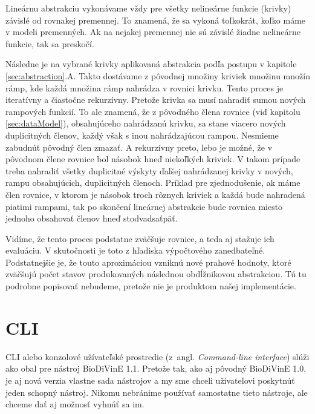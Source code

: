 \documentclass[11pt,final,oneside]{fithesis}
\begin{document}
Line\'arnu abstrakciu vykon\'avame v\v zdy pre v\v setky neline\'arne funkcie (krivky) z\'avisl\'e od rovnakej premennej. To znamen\'a, \v ze sa 
vykon\'a to\v lko\-kr\'at, ko\v lko m\'ame v modeli premenn\'ych. Ak na nejakej premennej nie s\'u z\'avisl\'e \v ziadne neline\'arne funkcie, tak sa 
presko\v c\'i.

N\'asledne je na vybran\'e krivky aplikovan\'a abstrakcia pod\v la postupu v kapitole \ref{sec:abstraction}.A. Takto dost\'avame z p\^ ovodnej mno\v ziny
kriviek mno\v zinu mno\v z\'in r\'amp, kde ka\v zd\'a mno\v zina r\'amp nahr\'adza v rovnici krivku. Tento proces je iterat\'ivny a \v ciasto\v cne 
rekurz\'ivny. Preto\v ze krivka sa mus\'i nahradi\v t sumou nov\'ych rampov\'ych funkci\'i. To ale znamen\'a, \v ze z p\^ ovodn\'eho \v clena rovnice 
(vi\v d kapitolu \ref{sec:dataModel}), obsahuj\'uceho nahr\'adzan\'u krivku, sa stane viacero nov\'ych duplicitn\'ych \v clenov, ka\v zd\'y v\v sak s inou 
nahr\'adzaj\'ucou rampou. Nesmieme zabudn\'u\v t p\^ ovodn\'y \v clen zmaza\v t. A rekurz\'ivny preto, lebo je mo\v zn\'e, \v ze v p\^ ovodnom \v clene rovnice
bol n\'asobok hne\v d nieko\v lk\'ych kriviek. V takom pr\'ipade treba nahradi\v t v\v setky duplicitn\'e v\'yskyty \v dal\v sej nahr\'adzanej krivky 
v nov\'ych, rampu obsahuj\'ucich, duplicitn\'ych \v clenoch. Pr\'iklad pre zjednodu\v senie, ak m\'ame \v clen rovnice, v ktorom je n\'asobok troch 
r\^ oznych kriviek a ka\v zd\'a bude nahraden\'a piatimi rampami, tak po skon\v cen\'i line\'arnej abstrakcie bude rovnica miesto jednoho obsahova\v t 
\v clenov hne\v d stodvadsa\v tp\" a\v t.

Vid\'ime, \v ze tento proces podstatne zv\" a\v c\v suje rovnice, a teda aj sta\v zuje ich evalu\'aciu. V skuto\v cnosti je toto z h\v ladiska 
v\'ypo\v ctov\'eho zanedbate\v ln\'e. Podstatnej\v sie je, \v ze touto aproxim\'aciou vznikn\'u nov\'e prahov\'e hodnoty, ktor\'e zv\" a\v c\v suj\'u 
po\v cet stavov produkovan\'ych n\'aslednou obd\'l\v znikovou abstrakciou. T\'u tu podrobne popisova\v t nebudeme, preto\v ze nie je produktom na\v sej 
implement\'acie.

\section{CLI}
\label{sec:implCLI}
CLI alebo konzolov\'e u\v z\'ivate\v lsk\'e prostredie (z~angl. {\it Command-line interface}) sl\'u\v zi ako obal pre n\'astroj BioDiVinE 1.1. Preto\v ze
tak, ako aj p\^ ovodn\'y BioDiVinE 1.0, je aj nov\'a verzia vlastne sada n\'astrojov a my sme chceli u\v z\'ivate\v lovi poskytn\'u\v t jeden schopn\'y 
n\'astroj. Nikomu nebr\'anime pou\v z\'iva\v t samostatne tieto n\'astroje, ale chceme da\v t aj mo\v znos\v t vyhn\'u\v t sa im.
\end{document}

